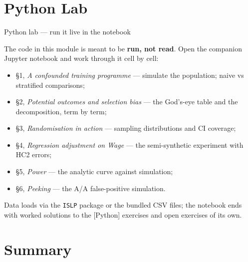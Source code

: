 \documentclass[aspectratio=169,11pt]{beamer}
\begin{document}
\section{Python Lab}

\begin{frame}{Python lab --- run it live in the notebook}
  \begin{labnote}
    The code in this module is meant to be \textbf{run, not read}. Open the companion
    Jupyter notebook and work through it cell by cell:
    \begin{itemize}
      \item \S1, \emph{A confounded training programme} --- simulate the population;
            naive vs stratified comparisons;
      \item \S2, \emph{Potential outcomes and selection bias} --- the God's-eye table and
            the decomposition, term by term;
      \item \S3, \emph{Randomisation in action} --- sampling distributions and CI coverage;
      \item \S4, \emph{Regression adjustment on Wage} --- the semi-synthetic experiment
            with HC2 errors;
      \item \S5, \emph{Power} --- the analytic curve against simulation;
      \item \S6, \emph{Peeking} --- the A/A false-positive simulation.
    \end{itemize}
    Data loads via the \texttt{ISLP} package or the bundled CSV files; the notebook ends
    with worked solutions to the [Python] exercises and open exercises of its own.
  \end{labnote}
\end{frame}

\section{Summary}
\end{document}
